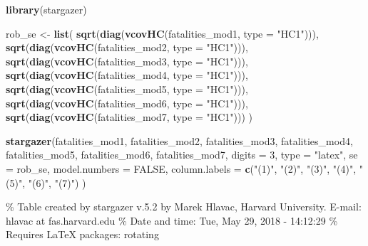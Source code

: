\documentclass[]{book}
\newenvironment{Shaded}{\begin{snugshade}}{\end{snugshade}}
\newcommand{\KeywordTok}[1]{\textcolor[rgb]{0.13,0.29,0.53}{\textbf{#1}}}
\newcommand{\DataTypeTok}[1]{\textcolor[rgb]{0.13,0.29,0.53}{#1}}
\newcommand{\DecValTok}[1]{\textcolor[rgb]{0.00,0.00,0.81}{#1}}
\newcommand{\StringTok}[1]{\textcolor[rgb]{0.31,0.60,0.02}{#1}}
\newcommand{\OtherTok}[1]{\textcolor[rgb]{0.56,0.35,0.01}{#1}}
\newcommand{\NormalTok}[1]{#1}
\theoremstyle{definition}
\theoremstyle{definition}
\theoremstyle{definition}
\theoremstyle{remark}
\begin{document}
\begin{Shaded}
\begin{Highlighting}[]
\KeywordTok{library}\NormalTok{(stargazer)}

\NormalTok{rob_se <-}\StringTok{ }\KeywordTok{list}\NormalTok{(}
  \KeywordTok{sqrt}\NormalTok{(}\KeywordTok{diag}\NormalTok{(}\KeywordTok{vcovHC}\NormalTok{(fatalities_mod1, }\DataTypeTok{type =} \StringTok{"HC1"}\NormalTok{))),}
  \KeywordTok{sqrt}\NormalTok{(}\KeywordTok{diag}\NormalTok{(}\KeywordTok{vcovHC}\NormalTok{(fatalities_mod2, }\DataTypeTok{type =} \StringTok{"HC1"}\NormalTok{))),}
  \KeywordTok{sqrt}\NormalTok{(}\KeywordTok{diag}\NormalTok{(}\KeywordTok{vcovHC}\NormalTok{(fatalities_mod3, }\DataTypeTok{type =} \StringTok{"HC1"}\NormalTok{))),}
  \KeywordTok{sqrt}\NormalTok{(}\KeywordTok{diag}\NormalTok{(}\KeywordTok{vcovHC}\NormalTok{(fatalities_mod4, }\DataTypeTok{type =} \StringTok{"HC1"}\NormalTok{))),}
  \KeywordTok{sqrt}\NormalTok{(}\KeywordTok{diag}\NormalTok{(}\KeywordTok{vcovHC}\NormalTok{(fatalities_mod5, }\DataTypeTok{type =} \StringTok{"HC1"}\NormalTok{))),}
  \KeywordTok{sqrt}\NormalTok{(}\KeywordTok{diag}\NormalTok{(}\KeywordTok{vcovHC}\NormalTok{(fatalities_mod6, }\DataTypeTok{type =} \StringTok{"HC1"}\NormalTok{))),}
  \KeywordTok{sqrt}\NormalTok{(}\KeywordTok{diag}\NormalTok{(}\KeywordTok{vcovHC}\NormalTok{(fatalities_mod7, }\DataTypeTok{type =} \StringTok{"HC1"}\NormalTok{)))}
\NormalTok{)}

\KeywordTok{stargazer}\NormalTok{(fatalities_mod1, fatalities_mod2, fatalities_mod3, }
\NormalTok{          fatalities_mod4, fatalities_mod5, fatalities_mod6, fatalities_mod7, }
          \DataTypeTok{digits =} \DecValTok{3}\NormalTok{,}
          \DataTypeTok{type =} \StringTok{"latex"}\NormalTok{, }
          \DataTypeTok{se =}\NormalTok{ rob_se,}
          \DataTypeTok{model.numbers =} \OtherTok{FALSE}\NormalTok{,}
          \DataTypeTok{column.labels =} \KeywordTok{c}\NormalTok{(}\StringTok{"(1)"}\NormalTok{, }\StringTok{"(2)"}\NormalTok{, }\StringTok{"(3)"}\NormalTok{, }\StringTok{"(4)"}\NormalTok{, }\StringTok{"(5)"}\NormalTok{, }\StringTok{"(6)"}\NormalTok{, }\StringTok{"(7)"}\NormalTok{)}
\NormalTok{          )}
\end{Highlighting}
\end{Shaded}

\% Table created by stargazer v.5.2 by Marek Hlavac, Harvard University.
E-mail: hlavac at fas.harvard.edu \% Date and time: Tue, May 29, 2018 -
14:12:29 \% Requires LaTeX packages: rotating
\end{document}
